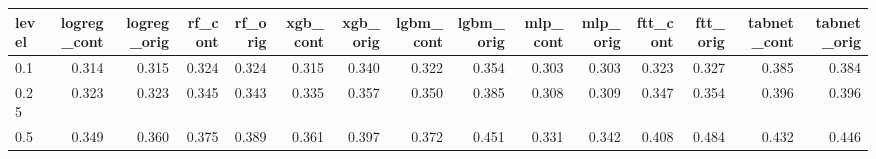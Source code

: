 \begin{tabular}{lrrrrrrrrrrrrrr}
\toprule
level & logreg\_cont & logreg\_orig & rf\_cont & rf\_orig & xgb\_cont & xgb\_orig & lgbm\_cont & lgbm\_orig & mlp\_cont & mlp\_orig & ftt\_cont & ftt\_orig & tabnet\_cont & tabnet\_orig \\
\midrule
0.1 & 0.314 & 0.315 & 0.324 & 0.324 & 0.315 & 0.340 & 0.322 & 0.354 & 0.303 & 0.303 & 0.323 & 0.327 & 0.385 & 0.384 \\
0.25 & 0.323 & 0.323 & 0.345 & 0.343 & 0.335 & 0.357 & 0.350 & 0.385 & 0.308 & 0.309 & 0.347 & 0.354 & 0.396 & 0.396 \\
0.5 & 0.349 & 0.360 & 0.375 & 0.389 & 0.361 & 0.397 & 0.372 & 0.451 & 0.331 & 0.342 & 0.408 & 0.484 & 0.432 & 0.446 \\
\bottomrule
\end{tabular}

